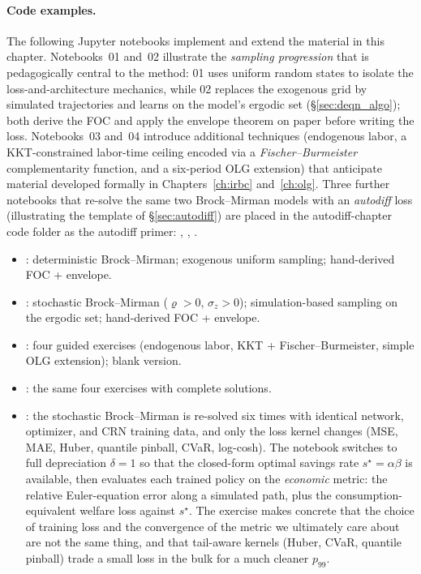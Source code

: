\documentclass[11pt,a4paper]{report}
\begin{document}
\paragraph{Code examples.}
The following Jupyter notebooks implement and extend the material in this chapter.  Notebooks~01 and~02 illustrate the \emph{sampling progression} that is pedagogically central to the method: 01 uses uniform random states to isolate the loss-and-architecture mechanics, while 02 replaces the exogenous grid by simulated trajectories and learns on the model's ergodic set (§\ref{sec:deqn_algo}); both derive the FOC and apply the envelope theorem on paper before writing the loss.  Notebooks~03 and~04 introduce additional techniques (endogenous labor, a KKT-constrained labor-time ceiling encoded via a \emph{Fischer--Burmeister} complementarity function, and a six-period OLG extension) that anticipate material developed formally in Chapters~\ref{ch:irbc} and~\ref{ch:olg}.  Three further notebooks that re-solve the same two Brock--Mirman models with an \emph{autodiff} loss (illustrating the template of \S\ref{sec:autodiff}) are placed in the autodiff-chapter code folder as the autodiff primer: , , .
\begin{itemize}[itemsep=2pt]
\item {}: deterministic Brock--Mirman; exogenous uniform sampling; hand-derived FOC + envelope.
\item {}: stochastic Brock--Mirman ($\varrho > 0$, $\sigma_z > 0$); simulation-based sampling on the ergodic set; hand-derived FOC + envelope.
\item {}: four guided exercises (endogenous labor, KKT + Fischer--Burmeister, simple OLG extension); blank version.
\item {}: the same four exercises with complete solutions.
\item {}: the stochastic Brock--Mirman is re-solved six times with identical network, optimizer, and CRN training data, and only the loss kernel changes (MSE, MAE, Huber, quantile pinball, CVaR, log-cosh).  The notebook switches to full depreciation $\delta=1$ so that the closed-form optimal savings rate $s^\star=\alpha\beta$ is available, then evaluates each trained policy on the \emph{economic} metric: the relative Euler-equation error along a simulated path, plus the consumption-equivalent welfare loss against $s^\star$.  The exercise makes concrete that the choice of training loss and the convergence of the metric we ultimately care about are not the same thing, and that tail-aware kernels (Huber, CVaR, quantile pinball) trade a small loss in the bulk for a much cleaner $p_{99}$.
\end{itemize}
\end{document}
